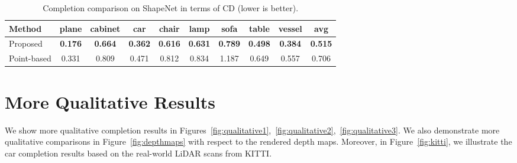 \documentclass[final]{cvpr}
\begin{document}
\begin{table}[h]
\begin{center}
\footnotesize
\setlength\tabcolsep{1.5pt}
\begin{tabular}{@{}l|cccccccc|c@{}}
\toprule
Method&plane&cabinet&car&chair&lamp&sofa&table&vessel&avg\\
\midrule
Proposed & \textbf{0.176} & \textbf{0.664} & \textbf{0.362} & \textbf{0.616} & \textbf{0.631} & \textbf{0.789} & \textbf{0.498} & \textbf{0.384} & \textbf{0.515} \\
Point-based & 0.331 & 0.809 & 0.471 & 0.812 & 0.834 & 1.187 & 0.649 & 0.557 & 0.706 \\
\bottomrule
\end{tabular}
\end{center}
\caption{Completion comparison on ShapeNet in terms of CD  (lower is better).}
\label{table:shapenet_cd}
\end{table}

\section{More Qualitative Results}
We show more qualitative completion results in Figures~\ref{fig:qualitative1},~\ref{fig:qualitative2},~\ref{fig:qualitative3}.
We also demonstrate more qualitative comparisons in Figure~\ref{fig:depthmaps} with respect to the rendered depth maps.
Moreover, in Figure~\ref{fig:kitti}, we illustrate the car completion results based on the real-world LiDAR scans from KITTI.
\end{document}
